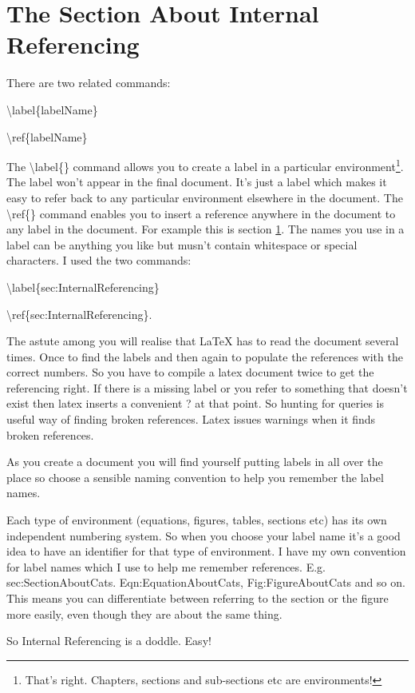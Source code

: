 \section{The Section About Internal Referencing}
\label{sec:InternalReferencing}

There are two related commands:

\vspace*{2ex}

{\textbackslash}label\{labelName\} 

{\textbackslash}ref\{labelName\}

\vspace*{2ex}


The {\textbackslash}label\{\} command allows you to create a label in a particular environment\footnote{That's right. Chapters, sections and sub-sections etc are environments!}. The label won't appear in the final document. It's just a label which makes it easy to refer back to any particular environment elsewhere in the document. The {\textbackslash}ref\{\} command enables you to insert a reference anywhere in the document to any label in the document.  For example this is section \ref{sec:InternalReferencing}. The names you use in a label can be anything you like but musn't contain whitespace or special characters. I used the two commands:

\vspace*{2ex}

{\textbackslash}label\{sec:InternalReferencing\}

{\textbackslash}ref\{sec:InternalReferencing\}.

\vspace*{2ex}

The astute among you will realise that LaTeX has to read the document several times. Once to find the labels and then again to populate the references with the correct numbers. So you have to compile a latex document twice to get the referencing right. If there is a missing label or you refer to something that doesn't exist then latex inserts a convenient ? at that point. So hunting for queries is useful way of finding broken references. Latex issues warnings when it finds broken references.

As you create a document you will find yourself putting labels in all over the place so choose a sensible naming convention to help you remember the label names.

Each type of environment (equations, figures, tables, sections etc) has its own independent numbering system.  So when you choose your label name it's a good idea to have an identifier for that type of environment.  I have my own convention for label names which I use to help me remember references. E.g.   sec:SectionAboutCats. Eqn:EquationAboutCats,  Fig:FigureAboutCats and so on. This means you can differentiate between referring to the section or the figure more easily, even though they are about the same thing.

So Internal Referencing is a doddle. Easy!